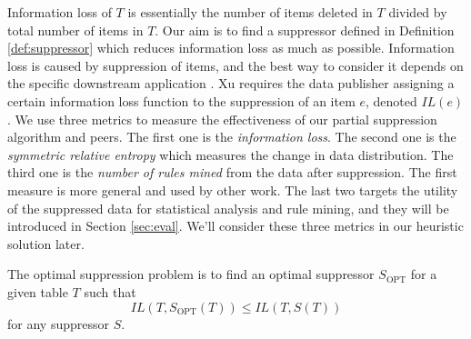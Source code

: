 Information loss of $T$ is essentially the number of items deleted in $T$
divided by total number of items in $T$. Our aim is to find a suppressor
defined in Definition \ref{def:suppressor} which reduces information loss as
much as possible. Information loss is caused by suppression of items, and the
best way to consider it depends on the specific downstream application
\cite{Xu:2008:ATD}. Xu \etal \cite{Xu:2008:ATD} requires the data publisher
assigning a certain information loss function to the suppression of an item
$e$, denoted $IL(e)$.
We use three metrics to measure the effectiveness of our partial suppression
algorithm and peers. The first one is the \emph{information loss}. The second
one is the \emph{symmetric relative entropy} which measures the change in
data distribution. The third one is the \emph{number of rules mined} from the
data after suppression. The first measure is more general and used by other
work. The last two targets the utility of the suppressed data for statistical
analysis and rule mining, and they will be introduced in Section
\ref{sec:eval}. We'll consider these three metrics in our
heuristic solution later.

\begin{definition}
\label{def:osp}
The optimal suppression problem is to find an optimal suppressor $S_\text{OPT}$ for a given table $T$ such that
\[ IL(T,S_\text{OPT}(T))\leq IL(T,S(T)) \] for any suppressor $S$.
\end{definition}

